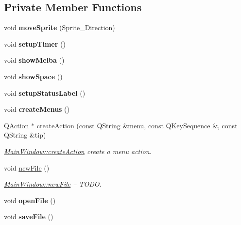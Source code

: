 \subsection*{Private Member Functions}
\begin{DoxyCompactItemize}
\item 
\mbox{\label{class_main_window_ad241698f69fdcf66d792f8ce6064a154}} 
void {\bfseries move\+Sprite} (Sprite\+\_\+\+Direction)
\item 
\mbox{\label{class_main_window_ad3776dfddc6ea10ce6331f1c142ac1ac}} 
void {\bfseries setup\+Timer} ()
\item 
\mbox{\label{class_main_window_a56ac2c93f1c691df939808c909140eb1}} 
void {\bfseries show\+Melba} ()
\item 
\mbox{\label{class_main_window_acf0d2ef2d17eb4b58e77b24574a244fd}} 
void {\bfseries show\+Space} ()
\item 
\mbox{\label{class_main_window_a354de8b79b7996530d6689c1a68cf858}} 
void {\bfseries setup\+Status\+Label} ()
\item 
\mbox{\label{class_main_window_aa4907b0251d305659e403c62921ef331}} 
void {\bfseries create\+Menus} ()
\item 
Q\+Action $\ast$ \hyperlink{class_main_window_a5916e4c4ce07f6de5e084d0cd27d81c2}{create\+Action} (const Q\+String \&menu, const Q\+Key\+Sequence \&, const Q\+String \&tip)
\begin{DoxyCompactList}\small\item\em \hyperlink{class_main_window_a5916e4c4ce07f6de5e084d0cd27d81c2}{Main\+Window\+::create\+Action} create a menu action. \end{DoxyCompactList}\item 
\mbox{\label{class_main_window_a69f73b93cc05c89a9ae1be0161105982}} 
void \hyperlink{class_main_window_a69f73b93cc05c89a9ae1be0161105982}{new\+File} ()
\begin{DoxyCompactList}\small\item\em \hyperlink{class_main_window_a69f73b93cc05c89a9ae1be0161105982}{Main\+Window\+::new\+File} -- T\+O\+DO. \end{DoxyCompactList}\item 
\mbox{\label{class_main_window_a288b768c3c21a9171bdc56fe845ece8b}} 
void {\bfseries open\+File} ()
\item 
\mbox{\label{class_main_window_a464aaa4d378e7b2d814756a73d6e1ed6}} 
void {\bfseries save\+File} ()
\end{DoxyCompactItemize}
